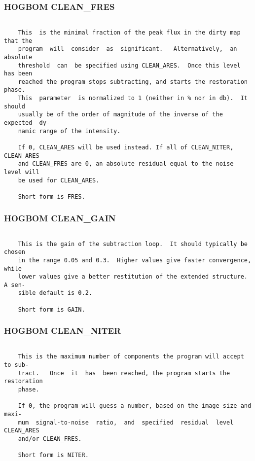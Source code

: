 \subsubsection{HOGBOM CLEAN\_FRES}
\begin{verbatim}

    This  is the minimal fraction of the peak flux in the dirty map that the
    program  will  consider  as  significant.   Alternatively,  an  absolute
    threshold  can  be specified using CLEAN_ARES.  Once this level has been
    reached the program stops subtracting, and starts the restoration phase.
    This  parameter  is normalized to 1 (neither in % nor in db).  It should
    usually be of the order of magnitude of the inverse of the expected  dy-
    namic range of the intensity.

    If 0, CLEAN_ARES will be used instead. If all of CLEAN_NITER, CLEAN_ARES
    and CLEAN_FRES are 0, an absolute residual equal to the noise level will
    be used for CLEAN_ARES.

    Short form is FRES.

\end{verbatim}
\subsubsection{HOGBOM CLEAN\_GAIN}
\begin{verbatim}

    This is the gain of the subtraction loop.  It should typically be chosen
    in the range 0.05 and 0.3.  Higher values give faster convergence, while
    lower values give a better restitution of the extended structure. A sen-
    sible default is 0.2.

    Short form is GAIN.

\end{verbatim}
\subsubsection{HOGBOM CLEAN\_NITER}
\begin{verbatim}

    This is the maximum number of components the program will accept to sub-
    tract.   Once  it  has  been reached, the program starts the restoration
    phase.

    If 0, the program will guess a number, based on the image size and maxi-
    mum  signal-to-noise  ratio,  and  specified  residual  level CLEAN_ARES
    and/or CLEAN_FRES.

    Short form is NITER.

\end{verbatim}
